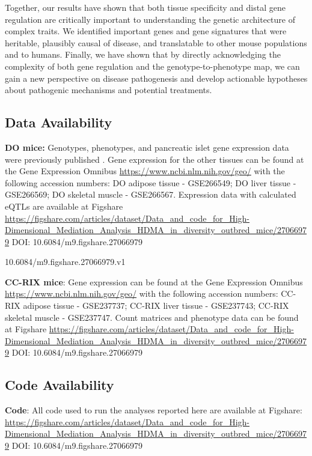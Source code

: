 \documentclass[
]{article}
\begin{document}
Together, our results have shown that both tissue specificity and distal
gene regulation are critically important to understanding the genetic
architecture of complex traits. We identified important genes and gene
signatures that were heritable, plausibly causal of disease, and
translatable to other mouse populations and to humans. Finally, we have
shown that by directly acknowledging the complexity of both gene
regulation and the genotype-to-phenotype map, we can gain a new
perspective on disease pathogenesis and develop actionable hypotheses
about pathogenic mechanisms and potential treatments.

\subsection{Data Availability}\label{data-availability}

\textbf{DO mice:} Genotypes, phenotypes, and pancreatic islet gene
expression data were previously published \cite{pmid29567659}. Gene
expression for the other tissues can be found at the Gene Expression
Omnibus \url{https://www.ncbi.nlm.nih.gov/geo/} with the following
accession numbers: DO adipose tissue - GSE266549; DO liver tissue -
GSE266569; DO skeletal muscle - GSE266567. Expression data with
calculated eQTLs are available at Figshare
\url{https://figshare.com/articles/dataset/Data_and_code_for_High-Dimensional_Mediation_Analysis_HDMA_in_diversity_outbred_mice/27066979}
DOI: 10.6084/m9.figshare.27066979

10.6084/m9.figshare.27066979.v1

\textbf{CC-RIX mice}: Gene expression can be found at the Gene
Expression Omnibus \url{https://www.ncbi.nlm.nih.gov/geo/} with the
following accession numbers: CC-RIX adipose tissue - GSE237737; CC-RIX
liver tissue - GSE237743; CC-RIX skeletal muscle - GSE237747. Count
matrices and phenotype data can be found at Figshare
\url{https://figshare.com/articles/dataset/Data_and_code_for_High-Dimensional_Mediation_Analysis_HDMA_in_diversity_outbred_mice/27066979}
DOI: 10.6084/m9.figshare.27066979

\subsection{Code Availability}\label{code-availability}

\textbf{Code}: All code used to run the analyses reported here are
available at Figshare:
\url{https://figshare.com/articles/dataset/Data_and_code_for_High-Dimensional_Mediation_Analysis_HDMA_in_diversity_outbred_mice/27066979}
DOI: 10.6084/m9.figshare.27066979
\end{document}
